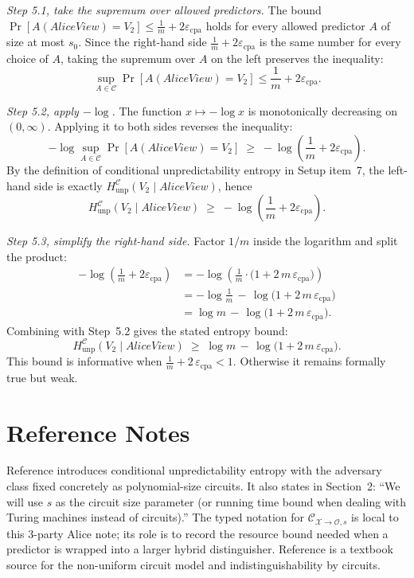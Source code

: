 \documentclass[11pt]{article}
\newcommand{\epscpa}{\varepsilon_{\mathrm{cpa}}}
\newcommand{\HunpC}{H_{\mathrm{unp}}^{\mathcal{C}}}
\newcommand{\C}{\mathcal{C}}
\newcommand{\AliceView}{\mathit{AliceView}}
\begin{document}
\textit{Step 5.1, take the supremum over allowed predictors.} The bound $\Pr[A(\AliceView) = V_2] \leq \frac{1}{m} + 2 \epscpa$ holds for every allowed predictor $A$ of size at most $s_0$. Since the right-hand side $\frac{1}{m} + 2 \epscpa$ is the same number for every choice of $A$, taking the supremum over $A$ on the left preserves the inequality:
\[
\sup_{A \in \C} \Pr[A(\AliceView) = V_2] \leq \frac{1}{m} + 2 \epscpa.
\]

\textit{Step 5.2, apply $-\log$.} The function $x \mapsto -\log x$ is monotonically decreasing on $(0, \infty)$. Applying it to both sides reverses the inequality:
\[
-\log \sup_{A \in \C} \Pr[A(\AliceView) = V_2] \;\geq\; -\log\left(\frac{1}{m} + 2 \epscpa\right).
\]
By the definition of conditional unpredictability entropy in Setup item~7, the left-hand side is exactly $\HunpC(V_2 \mid \AliceView)$, hence
\[
\HunpC(V_2 \mid \AliceView) \;\geq\; -\log\left(\frac{1}{m} + 2 \epscpa\right).
\]

\textit{Step 5.3, simplify the right-hand side.} Factor $1/m$ inside the logarithm and split the product:
\begin{align*}
-\log\left(\frac{1}{m} + 2 \epscpa\right)
&= -\log\left(\frac{1}{m} \cdot \big(1 + 2\,m\,\epscpa\big)\right) \\
&= -\log\frac{1}{m} \,-\, \log\!\big(1 + 2\,m\,\epscpa\big) \\
&= \log m \,-\, \log\!\big(1 + 2\,m\,\epscpa\big).
\end{align*}
Combining with Step~5.2 gives the stated entropy bound:
\[
\HunpC(V_2 \mid \AliceView) \;\geq\; \log m \,-\, \log\!\big(1 + 2\,m\,\epscpa\big).
\]
This bound is informative when $\frac{1}{m} + 2\,\epscpa < 1$. Otherwise it remains formally true but weak.

\section*{Reference Notes}

Reference \cite[Definition~7]{hsiao-lu-reyzin} introduces conditional unpredictability entropy with the adversary class fixed concretely as polynomial-size circuits. It also states in Section~2: ``We will use $s$ as the circuit size parameter (or running time bound when dealing with Turing machines instead of circuits).'' The typed notation for $\C_{\mathcal{X} \to \mathcal{O},s}$ is local to this 3-party Alice note; its role is to record the resource bound needed when a predictor is wrapped into a larger hybrid distinguisher. Reference \cite[Secs.~1.3.3 and 3.2.4]{goldreich-foc} is a textbook source for the non-uniform circuit model and indistinguishability by circuits.
\end{document}
